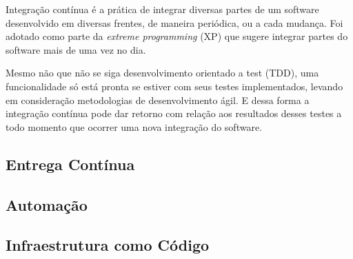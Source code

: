 Integração contínua é a prática de integrar diversas partes de um software
desenvolvido em diversas frentes, de maneira periódica, ou a cada mudança.
Foi adotado como parte da \textit{extreme programming} (XP) que sugere integrar
partes do software mais de uma vez no dia.

Mesmo não que não se siga desenvolvimento orientado a test (TDD), uma
funcionalidade só está pronta se estiver com seus testes implementados,
levando em consideração metodologias de desenvolvimento ágil. E dessa
forma a integração contínua pode dar retorno com relação aos resultados desses
testes a todo momento que ocorrer uma nova integração do software.

\subsection{Entrega Contínua}

\subsection{Automação}

\subsection{Infraestrutura como Código}


